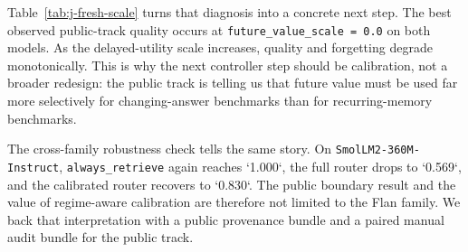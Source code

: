 \begin{table}[h]
\centering
\small

\caption{Public FreshQA delayed-utility calibration sweep from \texttt{artifacts/journal\_freshqa\_future\_scale\_sweep\_v1/aggregate\_table.md}.}
\label{tab:j-fresh-scale}
\end{table}

Table~\ref{tab:j-fresh-scale} turns that diagnosis into a concrete next step. The best observed public-track quality occurs at \texttt{future\_value\_scale = 0.0} on both models. As the delayed-utility scale increases, quality and forgetting degrade monotonically. This is why the next controller step should be calibration, not a broader redesign: the public track is telling us that future value must be used far more selectively for changing-answer benchmarks than for recurring-memory benchmarks.

The cross-family robustness check tells the same story. On \texttt{SmolLM2-360M-Instruct}, \texttt{always\_retrieve} again reaches `1.000`, the full router drops to `0.569`, and the calibrated router recovers to `0.830`. The public boundary result and the value of regime-aware calibration are therefore not limited to the Flan family. We back that interpretation with a public provenance bundle and a paired manual audit bundle for the public track.
